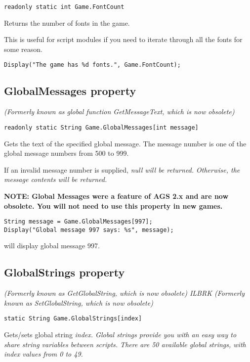 \begin{verbatim}
readonly static int Game.FontCount
\end{verbatim}
Returns the number of fonts in the game.

This is useful for script modules if you need to iterate through all the fonts for some reason.

\begin{verbatim}
Display("The game has %d fonts.", Game.FontCount);
\end{verbatim}


\subsection{GlobalMessages property}\label{Game.GlobalMessages}%

\it{(Formerly known as global function GetMessageText, which is now obsolete)}

\begin{verbatim}
readonly static String Game.GlobalMessages[int message]
\end{verbatim}
Gets the text of the specified global message. The message number is one of the global
message numbers from 500 to 999.

If an invalid message number is supplied, \it{null} will be returned. Otherwise, the
message contents will be returned.

\bf{NOTE:} Global Messages were a feature of AGS 2.x and are now obsolete. You will not
need to use this property in new games.

\begin{verbatim}
String message = Game.GlobalMessages[997];
Display("Global message 997 says: %s", message);
\end{verbatim}
will display global message 997.


\subsection{GlobalStrings property}\label{Game.GlobalStrings}%

\it{(Formerly known as GetGlobalString, which is now obsolete)} ILBRK
\it{(Formerly known as SetGlobalString, which is now obsolete)}

\begin{verbatim}
static String Game.GlobalStrings[index]
\end{verbatim}
Gets/sets global string \it{index}. Global strings provide you with an easy way to share
string variables between scripts. There are 50 available global strings, with \it{index}
values from 0 to 49.

